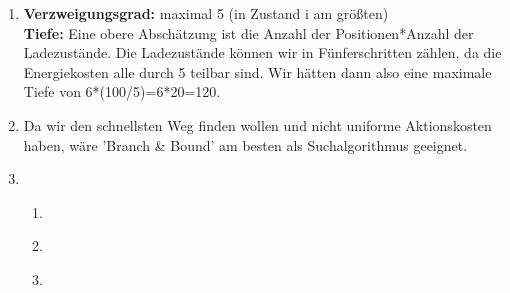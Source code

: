 \documentclass[a4paper,10pt]{article}
\begin{document}
\begin{enumerate}[~~a)]
    \item \textbf{Verzweigungsgrad:} maximal 5 (in Zustand i am größten) \\
    \textbf{Tiefe:} Eine obere Abschätzung ist die Anzahl der Positionen*Anzahl der Ladezustände. Die Ladezustände können wir in Fünferschritten zählen, da die Energiekosten alle durch 5 teilbar sind. Wir hätten dann also eine maximale Tiefe von 6*(100/5)=6*20=120.
    \item
    Da wir den schnellsten Weg finden wollen und nicht uniforme Aktionskosten haben, wäre 'Branch \& Bound' am besten als Suchalgorithmus geeignet.
    \item ~\\
    \begin{enumerate}[1.]
        \item ~\\
        \begin{center}
        \end{center}
        \item ~\\
        \begin{center}
        \end{center}
        \item ~\\
        \begin{center}
\end{center}
\end{enumerate}
\end{enumerate}
\end{document}
